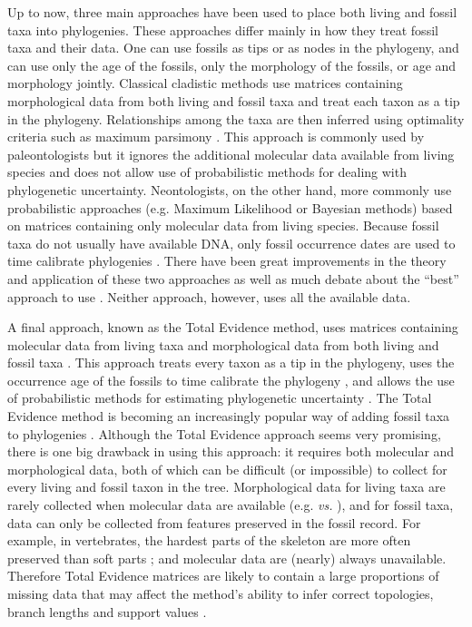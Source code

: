 Up to now, three main approaches have been used to place both living and fossil taxa into phylogenies.
These approaches differ mainly in how they treat fossil taxa and their data.
One can use fossils as tips or as nodes in the phylogeny, and can use only the age of the fossils, only the morphology of the fossils, or age and morphology jointly.
Classical cladistic methods use matrices containing morphological data from both living and fossil taxa and treat each taxon as a tip in the phylogeny. Relationships among the taxa are then inferred using optimality criteria such as maximum parsimony \citep{Hennig1966,felsenstein2004}.
This approach is commonly used by paleontologists but it ignores the additional molecular data available from living species and does not allow use of probabilistic methods for dealing with phylogenetic uncertainty.
Neontologists, on the other hand, more commonly use probabilistic approaches (e.g. Maximum Likelihood or Bayesian methods) based on matrices containing only molecular data from living species.
Because fossil taxa do not usually have available DNA, only fossil occurrence dates are used to time calibrate phylogenies \citep{zuckerkandl1965}.
There have been great improvements in the theory and application of these two approaches \citep[e.g.][]{bapsta2013,stadlerdating2013,heaththe2013} as well as much debate about the ``best'' approach to use \citep[e.g.][]{spencerefficacy2013,wrightbayesian2014}.
Neither approach, however, uses all the available data.

A final approach, known as the Total Evidence method, uses matrices containing molecular data from living taxa and morphological data from both living and fossil taxa \citep{eernissetaxonomic1993}.
This approach treats every taxon as a tip in the phylogeny, uses the occurrence age of the fossils to time calibrate the phylogeny \citep[known as tip-dating;][]{ronquista2012}, and allows the use of probabilistic methods for estimating phylogenetic uncertainty \citep{ronquista2012}.
The Total Evidence method is becoming an increasingly popular way of adding fossil taxa to phylogenies \citep[e.g.][]{pyrondivergence2011,ronquista2012,schragocombining2013,slaterphylogenetic2013,beckancient2014,Arcila2015131}.
Although the Total Evidence approach seems very promising, there is one big drawback in using this approach: it requires both molecular and morphological data, both of which can be difficult (or impossible) to collect for every living and fossil taxon in the tree.
Morphological data for living taxa are rarely collected when molecular data are available (e.g. \citealp{O'Leary08022013} \textit{vs.} \citealp{meredithimpacts2011}), and for fossil taxa, data can only be collected from features preserved in the fossil record.
For example, in vertebrates, the hardest parts of the skeleton are more often preserved than soft parts \citep{sansomfossilization2013}; and molecular data are (nearly) always unavailable.
Therefore Total Evidence matrices are likely to contain a large proportions of missing data that may affect the method's ability to infer correct topologies, branch lengths and support values \citep{salamin2003}. 

